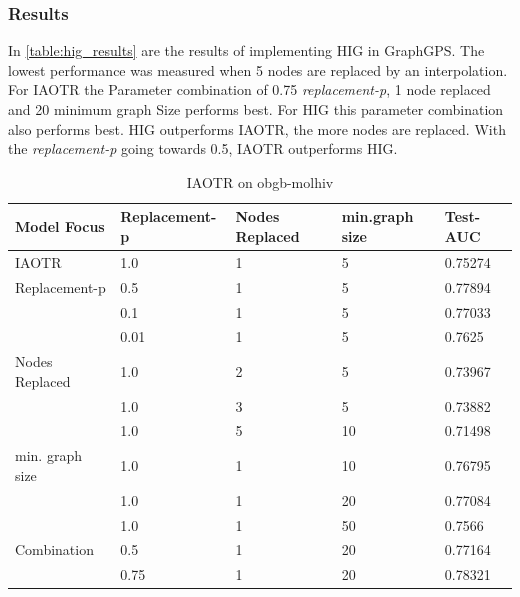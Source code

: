 \subsubsection{Results}
In \autoref{table:hig_results} are the results of implementing HIG in GraphGPS. The lowest performance was measured when 5 nodes are replaced by an interpolation. For IAOTR the Parameter combination of 0.75 \emph{replacement-p}, 1 node replaced and 20 minimum graph Size performs best. For HIG  this parameter combination also performs best. HIG outperforms IAOTR, the more nodes are replaced. With the \emph{replacement-p} going towards 0.5, IAOTR outperforms HIG.
\begin{table}[ht!]
    \centering
    \begin{tabular}{@{}lllll@{}}
        \toprule
        Model Focus     & Replacement-p & Nodes Replaced & min.graph size & Test-AUC \\ \midrule
        IAOTR           & 1.0           & 1              & 5              & 0.75274  \\
        Replacement-p   & 0.5           & 1              & 5              & 0.77894  \\
                        & 0.1           & 1              & 5              & 0.77033  \\
                        & 0.01          & 1              & 5              & 0.7625   \\
        Nodes Replaced  & 1.0           & 2              & 5              & 0.73967  \\
                        & 1.0           & 3              & 5              & 0.73882  \\
                        & 1.0           & 5              & 10             & 0.71498  \\
        min. graph size & 1.0           & 1              & 10             & 0.76795  \\
                        & 1.0           & 1              & 20             & 0.77084  \\
                        & 1.0           & 1              & 50             & 0.7566   \\
        Combination     & 0.5           & 1              & 20             & 0.77164  \\
                        & 0.75          & 1              & 20             & 0.78321  \\ \bottomrule
    \end{tabular}
    \caption{IAOTR on obgb-molhiv}
    \label{table:loss_results}
\end{table}

